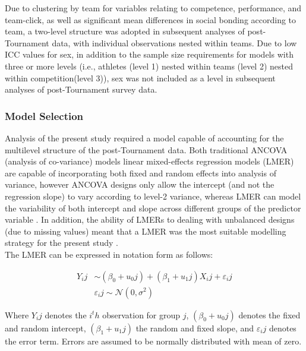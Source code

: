 \documentclass[12pt]{report}
\begin{document}
{



Due to clustering by team for variables relating to competence, performance, and team-click, as well as significant mean differences in social bonding according to team, a two-level structure was adopted in subsequent analyses of post-Tournament data, with individual observations nested within teams. Due to low ICC values for sex, in addition to the sample size requirements for models with three or more levels (i.e., athletes (level 1) nested within teams (level 2) nested within competition(level 3)), sex was not included as a level in subsequent analyses of post-Tournament survey data.


\clearpage
\subsubsection{Model Selection}
Analysis of the present study required a model capable of accounting for the multilevel structure of the post-Tournament data.  Both traditional ANCOVA (analysis of co-variance) models linear mixed-effects regression models (LMER) are capable of incorporating both fixed and random effects into analysis of variance, however ANCOVA designs only allow the intercept (and not the regression slope) to vary according to level-2 variance, whereas LMER can model the variability of both intercept and slope across different groups of the predictor variable \citep{Field2012}. In addition, the ability of LMERs to dealing with unbalanced designs (due to missing values) meant that a LMER was the most suitable modelling strategy for the present study \citep{Quene2004}.\\

The LMER can be expressed in notation form as follows:

  \begin{equation}
    \begin{align*}
      Y_ij & \sim  (\beta_0 + u_0j) + (\beta_1 + u_1j)X_ij + \varepsilon_ij\\
           & \varepsilon_ij \sim \mathcal{N}(0,\sigma^{2})
    \end{align*}
  \end{equation}


\bigskip
Where $Y_ij$ denotes the $i^th$ observation for group $j$, $(\beta_0 + u_0j)$ denotes the fixed and random intercept, $(\beta_1 + u_1j)$ the random and fixed slope, and $\varepsilon_ij$ denotes the error term.  Errors are assumed to be normally distributed with mean of zero.


}
\end{document}
